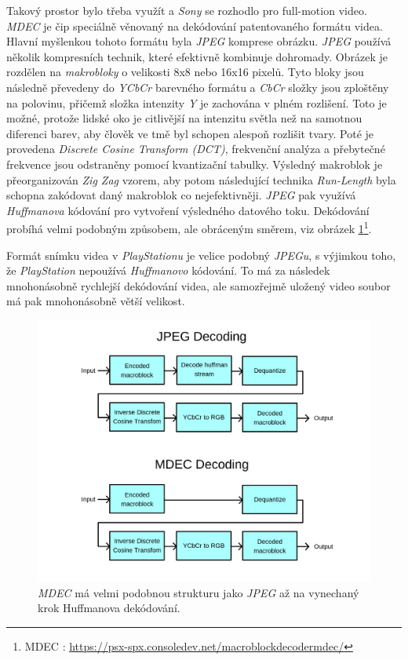 Takový prostor bylo třeba využít a \textit{Sony} se rozhodlo pro full-motion video. \textit{MDEC} je čip speciálně věnovaný
na dekódování patentovaného formátu videa. Hlavní myšlenkou tohoto formátu byla \textit{JPEG} komprese obrázku. \textit{JPEG} používá
několik kompresních technik, které efektivně kombinuje dohromady. Obrázek je rozdělen na \textit{makrobloky} o velikosti
8x8 nebo 16x16 pixelů. Tyto bloky jsou následně převedeny do \textit{YCbCr} barevného formátu a \textit{CbCr} složky jsou
zploštěny na polovinu, přičemž složka intenzity \textit{Y} je zachována v plném rozlišení. 
Toto je možné, protože lidské oko je citlivější na intenzitu světla než na samotnou diferenci barev, aby člověk ve tmě byl schopen
alespoň rozlišit tvary.
Poté je provedena \textit{Discrete Cosine Transform (DCT)}, frekvenční analýza a přebytečné frekvence jsou odstraněny
pomocí kvantizační tabulky. Výsledný makroblok je přeorganizován \textit{Zig Zag} vzorem, aby potom následující technika \textit{Run-Length}
byla schopna zakódovat daný makroblok co nejefektivněji. \textit{JPEG} pak využívá \textit{Huffmanova} kódování pro vytvoření výsledného datového toku.
Dekódování probíhá velmi podobným způsobem, ale obráceným směrem, viz obrázek \ref{mdec-decoding}\footnote{MDEC \cite{PSXSpec}: \url{https://psx-spx.consoledev.net/macroblockdecodermdec/}}.

Formát snímku videa v \textit{PlayStationu} je velice podobný \textit{JPEGu}, s výjimkou toho, že \textit{PlayStation} nepoužívá \textit{Huffmanovo} kódování.
To má za následek mnohonásobně rychlejší dekódování videa, ale samozřejmě uložený video soubor má pak mnohonásobně větší velikost.

\begin{figure}[hbt]
	\centering
	\includegraphics[width=1.0\textwidth]{obrazky-figures/mdec-decoding.png}
	\caption[\textit{MDEC} / \textit{JPEG} dekódování]{\textit{MDEC} má velmi podobnou strukturu jako \textit{JPEG} až na vynechaný krok Huffmanova dekódování.}
	\label{mdec-decoding}
\end{figure}

